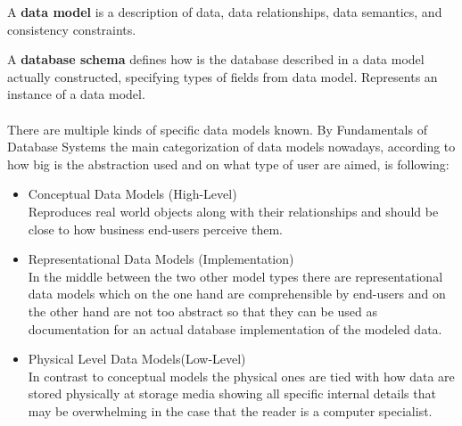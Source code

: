 \par
A \textbf{data model} is a description of data, data relationships, data semantics, and consistency constraints. \label{DataModel} \\
\par 
A \textbf{database schema} defines how is the database described in a data model actually constructed, specifying types of fields from data model. Represents an instance of a data model. \\
\\
There are multiple kinds of specific data models known.
By Fundamentals of Database Systems \cite{SilberschatzKorthSudarshan10} the main categorization of data models nowadays, according to how big is the abstraction used and on what type of user are aimed, is following: \label{DataModelsByAbstraction}
\begin{itemize}
	\item Conceptual Data Models (High-Level) \\
		Reproduces real world objects along with their relationships and should be close to how business end-users perceive them.
	
	\item Representational Data Models (Implementation) \\
		In the middle between the two other model types there are representational data models which on the one hand are comprehensible by end-users and on the other hand are not too abstract so that they can be used as documentation for an actual database implementation of the modeled data.
	
	\item Physical Level Data Models(Low-Level) \\
		 In contrast to conceptual models the physical ones are tied with how data are stored physically at storage media showing all specific internal details that may be overwhelming in the case that the reader is a computer specialist.
\end{itemize}

